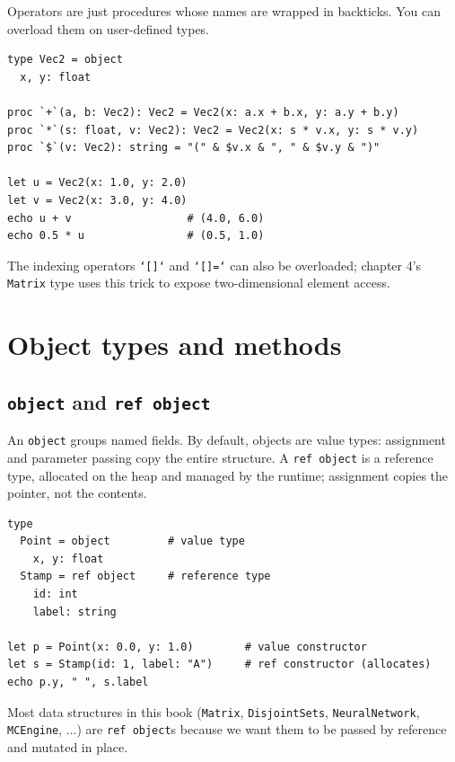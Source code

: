 \documentclass[justified, sixbynine]{tufte-book}
\def\ft{\small\tt}
\theoremstyle{plain}%
\newtheorem * {corollary}{Corollary}
\theoremstyle{definition}
\theoremstyle{remark}
\newtheorem * {remark}{Remark}
\newtheorem * {note}{Note}
\begin{document}
\begin{fullwidth}

Operators are just procedures whose names are wrapped in backticks. You can overload them on user-defined types.

\begin{lstlisting}
type Vec2 = object
  x, y: float

proc `+`(a, b: Vec2): Vec2 = Vec2(x: a.x + b.x, y: a.y + b.y)
proc `*`(s: float, v: Vec2): Vec2 = Vec2(x: s * v.x, y: s * v.y)
proc `$`(v: Vec2): string = "(" & $v.x & ", " & $v.y & ")"

let u = Vec2(x: 1.0, y: 2.0)
let v = Vec2(x: 3.0, y: 4.0)
echo u + v                  # (4.0, 6.0)
echo 0.5 * u                # (0.5, 1.0)
\end{lstlisting}

The indexing operators {\ft `[]`} and {\ft `[]=`} can also be overloaded; chapter 4's {\ft Matrix} type uses this trick to expose two-dimensional element access.

\goodbreak\section{Object types and methods}

\goodbreak\subsection{{\ft object} and {\ft ref object}}


An {\ft object} groups named fields. By default, objects are value types: assignment and parameter passing copy the entire structure. A {\ft ref object} is a reference type, allocated on the heap and managed by the runtime; assignment copies the pointer, not the contents.

\begin{lstlisting}
type
  Point = object         # value type
    x, y: float
  Stamp = ref object     # reference type
    id: int
    label: string

let p = Point(x: 0.0, y: 1.0)        # value constructor
let s = Stamp(id: 1, label: "A")     # ref constructor (allocates)
echo p.y, " ", s.label
\end{lstlisting}

Most data structures in this book ({\ft Matrix}, {\ft DisjointSets}, {\ft NeuralNetwork}, {\ft MCEngine}, ...) are {\ft ref object}s because we want them to be passed by reference and mutated in place.


\end{fullwidth}
\end{document}
